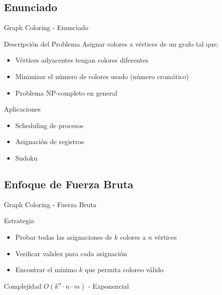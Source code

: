 \documentclass[aspectratio=169]{beamer}
\begin{document}
\subsection{Enunciado}
\begin{frame}{Graph Coloring - Enunciado}
\begin{block}{Descripción del Problema}
Asignar colores a vértices de un grafo tal que:
\begin{itemize}
\item Vértices adyacentes tengan colores diferentes
\item Minimizar el número de colores usado (número cromático)
\item Problema NP-completo en general
\end{itemize}
\end{block}

\begin{exampleblock}{Aplicaciones}
\begin{itemize}
\item Scheduling de procesos
\item Asignación de registros
\item Sudoku
\end{itemize}
\end{exampleblock}
\end{frame}

\subsection{Enfoque de Fuerza Bruta}
\begin{frame}{Graph Coloring - Fuerza Bruta}
\begin{block}{Estrategia}
\begin{itemize}
\item Probar todas las asignaciones de $k$ colores a $n$ vértices
\item Verificar validez para cada asignación
\item Encontrar el mínimo $k$ que permita coloreo válido
\end{itemize}
\end{block}

\begin{alertblock}{Complejidad}
$O(k^n \cdot n \cdot m)$ - Exponencial
\end{alertblock}
\end{frame}
\end{document}
